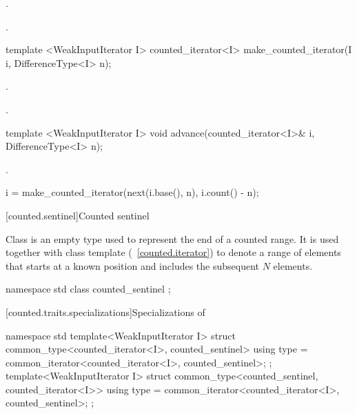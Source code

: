 \begin{addedblock}
\begin{itemdescr}
\pnum
\requires {}.

\pnum
\returns {}.
\end{itemdescr}

%
\begin{itemdecl}
template <WeakInputIterator I>
  counted_iterator<I> make_counted_iterator(I i, DifferenceType<I> n);
\end{itemdecl}

\begin{itemdescr}
\pnum
\requires {}.

\pnum
\returns {}.
\end{itemdescr}

%
\begin{itemdecl}
template <WeakInputIterator I>
  void advance(counted_iterator<I>& i, DifferenceType<I> n);
\end{itemdecl}

\begin{itemdescr}
\pnum
\requires {}.

\pnum
\effects
\begin{codeblock}
i = make_counted_iterator(next(i.base(), n), i.count() - n);
\end{codeblock}
\end{itemdescr}

[counted.sentinel]{Counted sentinel}

\pnum
Class  is an empty type used to represent the end of a counted
range. It is used together with class template
(~\ref{counted.iterator}) to denote a range of elements that
starts at a known position and includes the subsequent $N$ elements.

%
\begin{itemdecl}
namespace std {
  class counted_sentinel { };
}
\end{itemdecl}

[counted.traits.specializations]{Specializations of }

%
\begin{itemdecl}
namespace std {
  template<WeakInputIterator I>
  struct common_type<counted_iterator<I>, counted_sentinel> {
    using type = common_iterator<counted_iterator<I>, counted_sentinel>;
  };
  template<WeakInputIterator I>
  struct common_type<counted_sentinel, counted_iterator<I>> {
    using type = common_iterator<counted_iterator<I>, counted_sentinel>;
  };
}
\end{itemdecl}


\end{addedblock}

